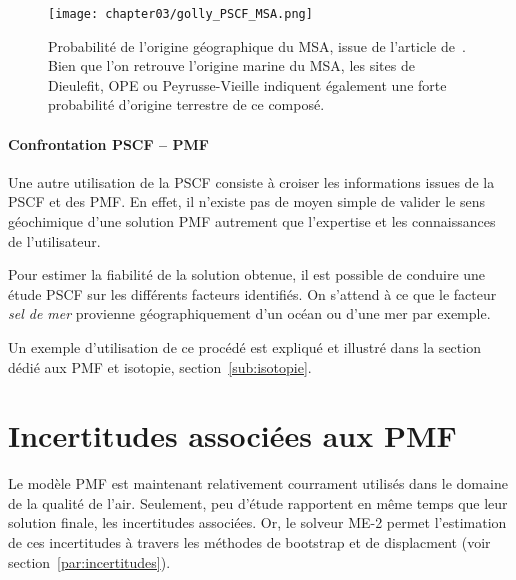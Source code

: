 \begin{figure}[ht!]
    \centering
    \texttt{[image: chapter03/golly\_PSCF\_MSA.png]}
    \caption{Probabilité de l'origine géographique du MSA, issue de l'article
        de~\textcite{gollyOrganic2019}. Bien que l'on retrouve l'origine marine du MSA,
        les sites de Dieulefit, OPE ou Peyrusse-Vieille indiquent également une forte
        probabilité d'origine terrestre de ce composé.}%
    \label{fig:chapter03/golly_PSCF_MSA}
\end{figure}

\paragraph{Confrontation PSCF -- PMF}%
\label{par:confrontation_pscf_pmf}

Une autre utilisation de la PSCF consiste à croiser les informations issues de la PSCF et
des PMF.
En effet, il n'existe pas de moyen simple de valider le sens géochimique d'une solution
PMF autrement que l'expertise et les connaissances de l'utilisateur.

Pour estimer la fiabilité de la solution obtenue, il est possible de conduire une
étude PSCF sur les différents facteurs identifiés. On s'attend à ce que le
facteur \textit{sel de mer} provienne géographiquement d'un océan ou d'une mer par
exemple.

Un exemple d'utilisation de ce procédé est expliqué et illustré dans la section dédié aux
PMF et isotopie, section~\ref{sub:isotopie}.



\section{Incertitudes associées aux PMF}%
\label{sub:incertitudes_associées}

Le modèle PMF est maintenant relativement courrament utilisés dans le domaine de la
qualité de l'air. Seulement, peu d'étude rapportent en même temps que leur solution
finale, les incertitudes associées. Or, le solveur ME-2 permet l'estimation de ces
incertitudes à travers les méthodes de bootstrap et de displacment (voir
section~\ref{par:incertitudes}).

